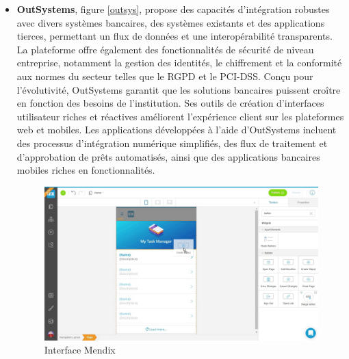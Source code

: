 \begin{itemize}

    \item \textbf{OutSystems}, figure \ref*{outsys}, propose des capacités d'intégration robustes avec divers systèmes bancaires, des systèmes existants et des applications tierces, permettant un flux de données et une interopérabilité transparents. La plateforme offre également des fonctionnalités de sécurité de niveau entreprise, notamment la gestion des identités, le chiffrement et la conformité aux normes du secteur telles que le RGPD et le PCI-DSS. Conçu pour l'évolutivité, OutSystems garantit que les solutions bancaires puissent croître en fonction des besoins de l'institution. Ses outils de création d'interfaces utilisateur riches et réactives améliorent l'expérience client sur les plateformes web et mobiles. Les applications développées à l'aide d'OutSystems incluent des processus d'intégration numérique simplifiés, des flux de traitement et d'approbation de prêts automatisés, ainsi que des applications bancaires mobiles riches en fonctionnalités.



          \begin{figure}[H]
              \centering
              \includegraphics[width=16cm]{Figures/imendix.jpg}
              \caption{Interface Mendix}
              \label{mendiz} %
          \end{figure}



\end{itemize}
